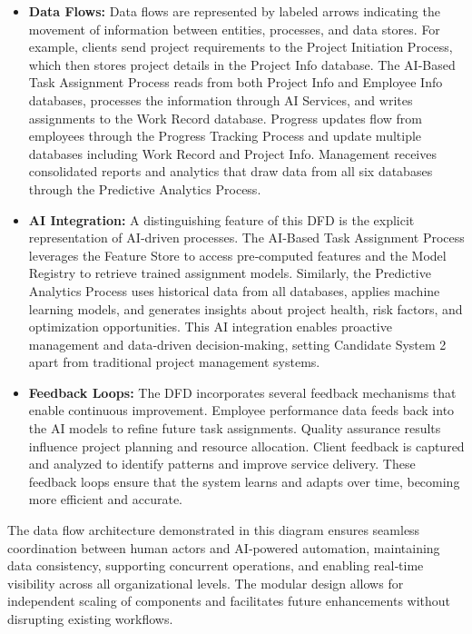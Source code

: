 \documentclass[12pt,a4paper]{article}
\begin{document}
\begin{itemize}
    \item \textbf{Data Flows:} Data flows are represented by labeled arrows indicating the movement of information between entities, processes, and data stores.  For example, clients send project requirements to the Project Initiation Process, which then stores project details in the Project Info database.  The AI‑Based Task Assignment Process reads from both Project Info and Employee Info databases, processes the information through AI Services, and writes assignments to the Work Record database.  Progress updates flow from employees through the Progress Tracking Process and update multiple databases including Work Record and Project Info.  Management receives consolidated reports and analytics that draw data from all six databases through the Predictive Analytics Process.

    \item \textbf{AI Integration:} A distinguishing feature of this DFD is the explicit representation of AI‑driven processes.  The AI‑Based Task Assignment Process leverages the Feature Store to access pre‑computed features and the Model Registry to retrieve trained assignment models.  Similarly, the Predictive Analytics Process uses historical data from all databases, applies machine learning models, and generates insights about project health, risk factors, and optimization opportunities.  This AI integration enables proactive management and data‑driven decision‑making, setting Candidate System 2 apart from traditional project management systems.

    \item \textbf{Feedback Loops:} The DFD incorporates several feedback mechanisms that enable continuous improvement.  Employee performance data feeds back into the AI models to refine future task assignments.  Quality assurance results influence project planning and resource allocation.  Client feedback is captured and analyzed to identify patterns and improve service delivery.  These feedback loops ensure that the system learns and adapts over time, becoming more efficient and accurate.
\end{itemize}

The data flow architecture demonstrated in this diagram ensures seamless coordination between human actors and AI‑powered automation, maintaining data consistency, supporting concurrent operations, and enabling real‑time visibility across all organizational levels.  The modular design allows for independent scaling of components and facilitates future enhancements without disrupting existing workflows.
\end{document}

